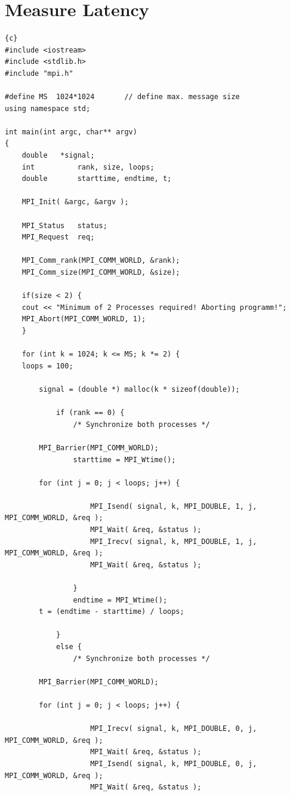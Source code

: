 \documentclass{article}
\newcommand{\enterProblemHeader}[1]{
}
\newcommand{\exitProblemHeader}[1]{
}
\newcounter{homeworkProblemCounter} %
\newcommand{\homeworkProblemName}{}
\newenvironment{homeworkProblem}[1][Problem \arabic{homeworkProblemCounter}]{ %
\stepcounter{homeworkProblemCounter} %
\renewcommand{\homeworkProblemName}{#1} %
\section{\homeworkProblemName} %
}{
}
\begin{document}
\begin{homeworkProblem}[Measure Latency]
\begin{lstlisting}{c}
#include <iostream>
#include <stdlib.h>
#include "mpi.h"

#define MS 	1024*1024		// define max. message size
using namespace std;

int main(int argc, char** argv)
{
    double 	 *signal;
    int          rank, size, loops;
    double       starttime, endtime, t;
   
    MPI_Init( &argc, &argv );
	
    MPI_Status   status;
    MPI_Request  req;

    MPI_Comm_rank(MPI_COMM_WORLD, &rank);
    MPI_Comm_size(MPI_COMM_WORLD, &size);

    if(size < 2) {
	cout << "Minimum of 2 Processes required! Aborting programm!";
	MPI_Abort(MPI_COMM_WORLD, 1);
    }

    for (int k = 1024; k <= MS; k *= 2) {
	loops = 100;

        signal = (double *) malloc(k * sizeof(double));

            if (rank == 0) {
                /* Synchronize both processes */
		
		MPI_Barrier(MPI_COMM_WORLD); 
                starttime = MPI_Wtime();
                
		for (int j = 0; j < loops; j++) {
		  
                    MPI_Isend( signal, k, MPI_DOUBLE, 1, j, MPI_COMM_WORLD, &req );
                    MPI_Wait( &req, &status );
                    MPI_Irecv( signal, k, MPI_DOUBLE, 1, j, MPI_COMM_WORLD, &req );
                    MPI_Wait( &req, &status );
		    
                }
                endtime = MPI_Wtime();
		t = (endtime - starttime) / loops;
                
            }
            else {
                /* Synchronize both processes */
		
		MPI_Barrier(MPI_COMM_WORLD);
                
		for (int j = 0; j < loops; j++) {
		  
                    MPI_Irecv( signal, k, MPI_DOUBLE, 0, j, MPI_COMM_WORLD, &req );
                    MPI_Wait( &req, &status );
                    MPI_Isend( signal, k, MPI_DOUBLE, 0, j, MPI_COMM_WORLD, &req );
                    MPI_Wait( &req, &status );
		    

\end{lstlisting}
\end{homeworkProblem}
\end{document}
